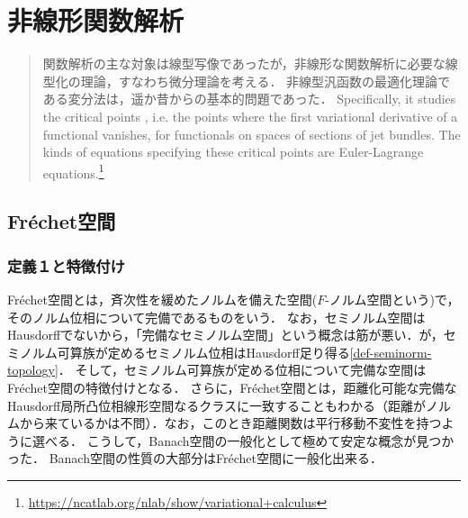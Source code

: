 \documentclass[uplatex,dvipdfmx]{jsreport}
\begin{document}
\chapter{非線形関数解析}

\begin{quotation}
    関数解析の主な対象は線型写像であったが，非線形な関数解析に必要な線型化の理論，すなわち微分理論を考える．
    非線型汎函数の最適化理論である変分法は，遥か昔からの基本的問題であった．
    Specifically, it studies the critical points , i.e. the points where the first variational derivative of a functional vanishes, for functionals on spaces of sections of jet bundles. The kinds of equations specifying these critical points are Euler-Lagrange equations.\footnote{\url{https://ncatlab.org/nlab/show/variational+calculus}}
\end{quotation}

\section{Fréchet空間}

\subsection{定義１と特徴付け}

\begin{tcolorbox}[colframe=ForestGreen, colback=ForestGreen!10!white,breakable,colbacktitle=ForestGreen!40!white,coltitle=black,fonttitle=\bfseries\sffamily,
title=局所凸な$F$-空間]
    Fréchet空間とは，斉次性を緩めたノルムを備えた空間($F$-ノルム空間という)で，そのノルム位相について完備であるものをいう．
    なお，セミノルム空間はHausdorffでないから，「完備なセミノルム空間」という概念は筋が悪い．が，セミノルム可算族が定めるセミノルム位相はHausdorff足り得る\ref{def-seminorm-topology}．
    そして，セミノルム可算族が定める位相について完備な空間はFréchet空間の特徴付けとなる．
    さらに，Fréchet空間とは，距離化可能な完備なHausdorff局所凸位相線形空間なるクラスに一致することもわかる（距離がノルムから来ているかは不問）．なお，このとき距離関数は平行移動不変性を持つように選べる．
    こうして，Banach空間の一般化として極めて安定な概念が見つかった．
    Banach空間の性質の大部分はFréchet空間に一般化出来る．
\end{tcolorbox}
\end{document}
